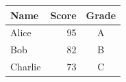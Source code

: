 \begin{longtable}[]{@{}lrc@{}}
\toprule
\textbf{Name} & \textbf{Score} & \textbf{Grade} \\
\midrule
Alice & 95 & A \\
Bob & 82 & B \\
Charlie & 73 & C \\
\bottomrule
\end{longtable}
